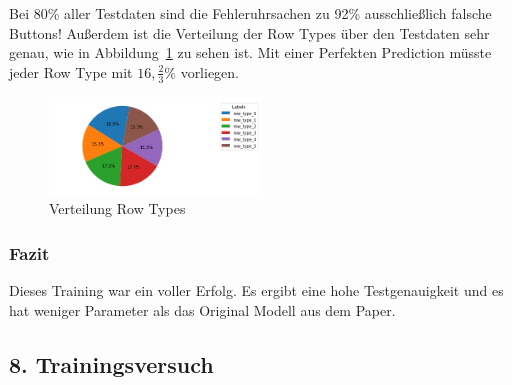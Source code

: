 \documentclass[pdftex,a4paper,halfparskip, article]{scrartcl}
\begin{document}
Bei 80\% aller Testdaten sind die Fehleruhrsachen zu 92\% ausschließlich falsche Buttons! Außerdem ist die Verteilung der Row Types über den Testdaten sehr genau, wie in Abbildung~\ref{fig:bin10_row_type} zu sehen ist. Mit einer Perfekten Prediction müsste jeder Row Type mit $16,\frac{2}{3}\%$ vorliegen.

\begin{figure}[h]
\centering
\includegraphics[width=0.5\textwidth]{predictions_bin10_predicted_row_type_distribution}
\caption{Verteilung Row Types}
\label{fig:bin10_row_type}
\end{figure}


\subsubsection*{Fazit}

Dieses Training war ein voller Erfolg. Es ergibt eine hohe Testgenauigkeit und es hat weniger Parameter als das Original Modell aus dem Paper. 

\subsection{8. Trainingsversuch}
\end{document}
